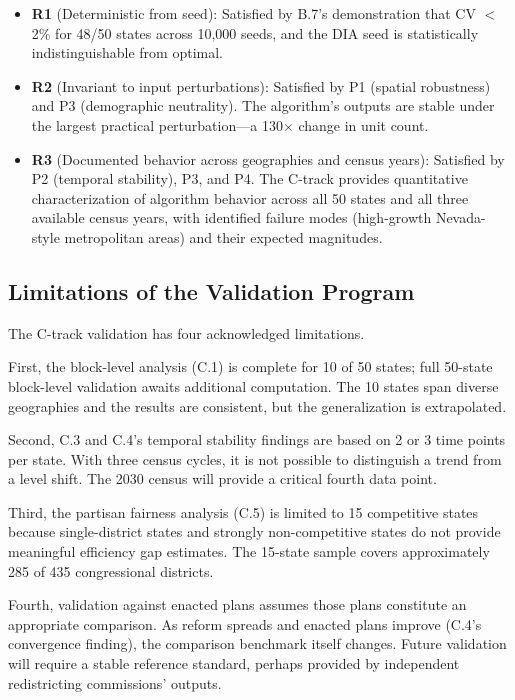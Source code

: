 \begin{itemize}
  \item \textbf{R1} (Deterministic from seed): Satisfied by B.7's
    demonstration that CV $<$ 2\% for 48/50 states across 10,000
    seeds, and the DIA seed is statistically indistinguishable from
    optimal.

  \item \textbf{R2} (Invariant to input perturbations): Satisfied by
    P1 (spatial robustness) and P3 (demographic neutrality). The
    algorithm's outputs are stable under the largest practical
    perturbation---a 130$\times$ change in unit count.

  \item \textbf{R3} (Documented behavior across geographies and census
    years): Satisfied by P2 (temporal stability), P3, and P4.
    The C-track provides quantitative characterization of algorithm
    behavior across all 50 states and all three available census years,
    with identified failure modes (high-growth Nevada-style metropolitan
    areas) and their expected magnitudes.
\end{itemize}

\subsection{Limitations of the Validation Program}

The C-track validation has four acknowledged limitations.

First, the block-level analysis (C.1) is complete for 10 of 50 states;
full 50-state block-level validation awaits additional computation.
The 10 states span diverse geographies and the results are consistent,
but the generalization is extrapolated.

Second, C.3 and C.4's temporal stability findings are based on 2 or 3
time points per state. With three census cycles, it is not possible
to distinguish a trend from a level shift. The 2030 census will provide
a critical fourth data point.

Third, the partisan fairness analysis (C.5) is limited to 15
competitive states because single-district states and strongly
non-competitive states do not provide meaningful efficiency gap
estimates. The 15-state sample covers approximately 285 of 435
congressional districts.

Fourth, validation against enacted plans assumes those plans constitute
an appropriate comparison. As reform spreads and enacted plans improve
(C.4's convergence finding), the comparison benchmark itself changes.
Future validation will require a stable reference standard, perhaps
provided by independent redistricting commissions' outputs.
